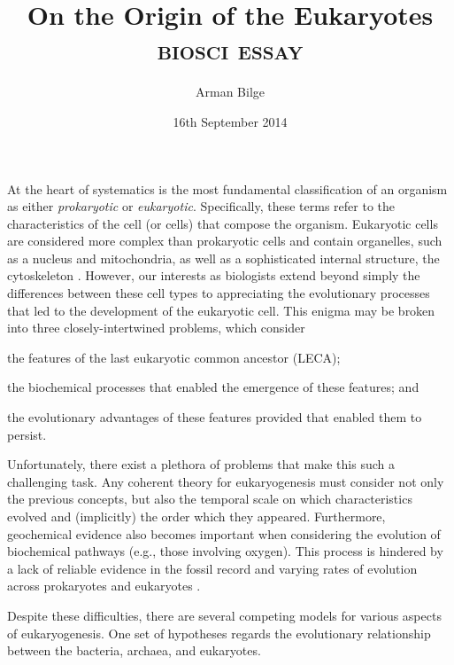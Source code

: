 \documentclass{article}
\title{On the Origin of the Eukaryotes \\
           \Large\textsc{biosci \oldstylenums{210} essay}}
\author{Arman Bilge}
\date{16th September 2014}
\begin{document}
    \maketitle

    At the heart of systematics is the most fundamental classification of an
        organism as either \emph{prokaryotic} or \emph{eukaryotic}.
    Specifically, these terms refer to the characteristics of the cell (or
        cells) that compose the organism.
    Eukaryotic cells are considered more complex than prokaryotic cells and
        contain organelles, such as a nucleus and mitochondria, as well as a
        sophisticated internal structure, the cytoskeleton
        \parencite{Koo10b,Kat12}.
    However, our interests as biologists extend beyond simply the differences
        between these cell types to appreciating the evolutionary processes
        that led to the development of the eukaryotic cell.
    This enigma may be broken into three closely-intertwined problems, which
        consider\begin{inparaenum}
        \item the features of the last eukaryotic common ancestor (LECA);
        \item the biochemical processes that enabled the emergence of these
        features; and
        \item the evolutionary advantages of these features provided that enabled them
        to persist.
    \end{inparaenum}
    Unfortunately, there exist a plethora of problems that make this such a
    challenging task.
    Any coherent theory for eukaryogenesis must consider not only the previous concepts, but also the temporal scale on which
    characteristics evolved and (implicitly) the order which they appeared.
    Furthermore, geochemical evidence also becomes important when considering
    the evolution of biochemical pathways (e.g., those involving oxygen).
    This process is hindered by a lack of reliable evidence in the fossil
    record \parencite{Sog91} and varying rates of evolution across prokaryotes
    and eukaryotes \parencite{Hed+01}.

    Despite these difficulties, there are several competing models for
    various aspects of eukaryogenesis. One set of hypotheses regards the
    evolutionary relationship between the bacteria, archaea, and eukaryotes.

    \printbibliography
\end{document}

